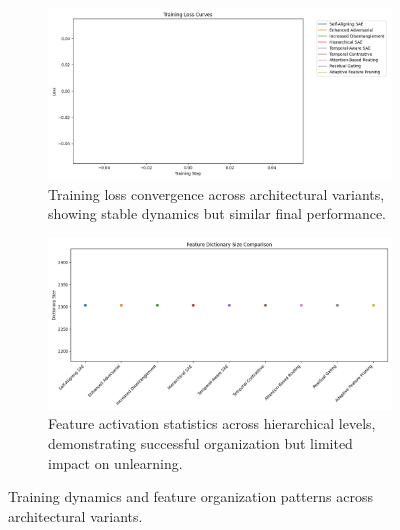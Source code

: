 \documentclass{article} %
\begin{document}
\begin{figure}[h]
    \centering
    \begin{subfigure}{0.49\textwidth}
        \includegraphics[width=\textwidth]{training_curves.png}
        \caption{Training loss convergence across architectural variants, showing stable dynamics but similar final performance.}
        \label{fig:training_curves}
    \end{subfigure}
    \hfill
    \begin{subfigure}{0.49\textwidth}
        \includegraphics[width=\textwidth]{feature_statistics.png}
        \caption{Feature activation statistics across hierarchical levels, demonstrating successful organization but limited impact on unlearning.}
        \label{fig:feature_statistics}
    \end{subfigure}
    \caption{Training dynamics and feature organization patterns across architectural variants.}
    \label{fig:first_figure}
\end{figure}
\end{document}
